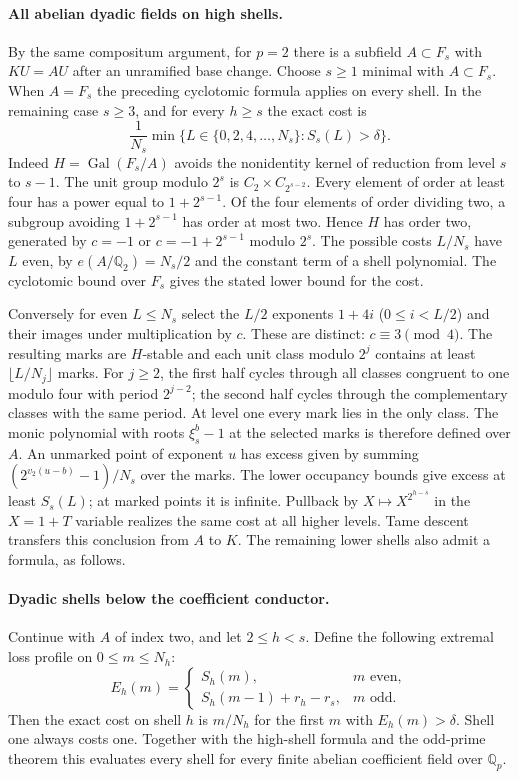 \paragraph{All abelian dyadic fields on high shells.}
By the same compositum argument, for $p=2$ there is a subfield
$A\subset F_s$ with $KU=AU$ after an unramified base change. Choose
$s\ge1$ minimal with $A\subset F_s$. When $A=F_s$ the preceding
cyclotomic formula applies on every shell. In the remaining case $s\ge3$,
and for every $h\ge s$ the exact cost is
\[
 \frac1{N_s}\min\{L\in\{0,2,4,\ldots,N_s\}: S_s(L)>\delta\}.
\]
Indeed $H=\operatorname{Gal}(F_s/A)$ avoids the nonidentity kernel of
reduction from level $s$ to $s-1$. The unit group modulo $2^s$
is $C_2\times C_{2^{s-2}}$. Every element of order at least four has a
power equal to $1+2^{s-1}$. Of the four elements of order dividing two,
a subgroup avoiding $1+2^{s-1}$ has order at most two. Hence $H$ has
order two, generated by $c=-1$ or $c=-1+2^{s-1}$ modulo $2^s$.
The possible costs $L/N_s$ have $L$ even, by
$e(A/\mathbb Q_2)=N_s/2$ and the constant term of a shell polynomial.
The cyclotomic bound over $F_s$ gives the stated lower bound for the cost.

Conversely for even $L\le N_s$ select the $L/2$ exponents
$1+4i$ ($0\le i<L/2$) and their images under multiplication by $c$.
These are distinct: $c\equiv3\pmod4$.
The resulting marks are $H$-stable and each unit class modulo $2^j$
contains at least $\lfloor L/N_j\rfloor$ marks. For $j\ge2$, the first
half cycles through all classes congruent to one modulo four with period
$2^{j-2}$; the second half cycles through the complementary classes with
the same period. At level one every mark lies in the only class.
The monic polynomial with roots $\xi_s^b-1$ at the selected marks
is therefore defined over $A$. An unmarked point of exponent $u$ has
excess given by summing $(2^{v_2(u-b)}-1)/N_s$ over the marks.
The lower occupancy bounds give excess at least $S_s(L)$; at marked
points it is infinite. Pullback by $X\mapsto X^{2^{h-s}}$ in the
$X=1+T$ variable realizes the same cost at all higher levels.
Tame descent transfers this conclusion from $A$ to $K$.
The remaining lower shells also admit a formula, as follows.

\paragraph{Dyadic shells below the coefficient conductor.}
Continue with $A$ of index two, and let $2\le h<s$. Define the
following extremal loss profile on $0\le m\le N_h$:
\[
 E_h(m)=
 \begin{cases}
 S_h(m),&m\text{ even},\\
 S_h(m-1)+r_h-r_s,&m\text{ odd}.
 \end{cases}
\]
Then the exact cost on shell $h$ is $m/N_h$ for the first $m$ with
$E_h(m)>\delta$. Shell one always costs one. Together with the high-shell
formula and the odd-prime theorem this evaluates every shell for every
finite abelian coefficient field over $\mathbb Q_p$.

